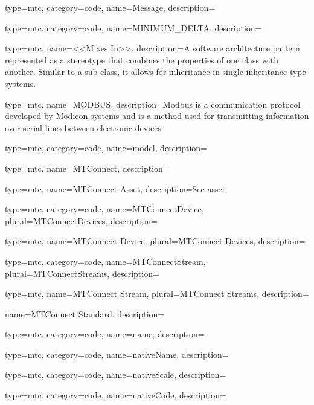{
type=mtc,
category=code,
name={Message},
description={}
}

{
  type=mtc,
  category=code,
  name={MINIMUM\_DELTA},
  description={}
}

{
  type=mtc,
  name={<<Mixes In>>},
  description={A software architecture pattern represented as a \gls{stereotype} that combines the properties of one class with another. Similar to a sub-class, it allows for inheritance in single inheritance type systems.}
}

{
  type=mtc,
  name=MODBUS,
  description={Modbus is a communication protocol developed by Modicon systems and is a method used for transmitting information over serial lines between electronic devices}
}

{
  type=mtc,
  category=code,
  name={model},
  description={}
}

{
  type=mtc,
  name={MTConnect},
  description={}
}

{
  type=mtc,
  name={MTConnect Asset},
  description={See \gls{asset}}
}

{
  type=mtc,
  category=code,
  name={MTConnectDevice},
  plural={MTConnectDevices},
  description={}
}

{
  type=mtc,
  name={MTConnect Device},
  plural={MTConnect Devices},
  description={}
}


{
  type=mtc,
  category=code,
  name={MTConnectStream},
  plural={MTConnectStreams},
  description={}
}

{
  type=mtc,
  name={MTConnect Stream},
  plural={MTConnect Streams},
  description={}
}

{
  name={MTConnect Standard},
  description={}
}

{
  type=mtc,
  category=code,
  name={name},
  description={}
}

{
  type=mtc,
  category=code,
  name={nativeName},
  description={}
}

{
type=mtc,
category=code,
name={nativeScale},
description={}
}

{
  type=mtc,
  category=code,
  name={nativeCode},
  description={}
}

